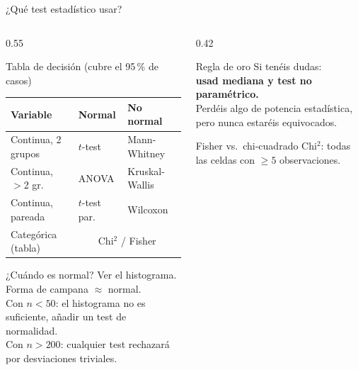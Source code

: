 \documentclass[aspectratio=169,10pt]{beamer}
\begin{document}
\begin{frame}{¿Qué test estadístico usar?}
  \begin{columns}[T]
    \begin{column}{0.55\textwidth}
      \begin{block}{Tabla de decisión (cubre el 95\,\% de casos)}
        \centering\small
        \renewcommand{\arraystretch}{1.4}
        \begin{tabular}{p{2.8cm}p{1.9cm}p{1.9cm}}
          \toprule
          \textbf{Variable} & \textbf{Normal} & \textbf{No normal} \\
          \midrule
          Continua, 2 grupos & $t$-test & Mann-Whitney \\
          Continua, $>$2 gr. & ANOVA & Kruskal-Wallis \\
          Continua, pareada  & $t$-test par. & Wilcoxon \\
          Categórica (tabla) & \multicolumn{2}{c}{Chi$^2$ / Fisher} \\
          \bottomrule
        \end{tabular}
      \end{block}
      \vspace{3mm}
      \begin{exampleblock}{¿Cuándo es normal?}
        \scriptsize Ver el histograma. Forma de campana $\approx$ normal.\\
        Con $n<50$: el histograma no es suficiente, añadir un test de normalidad.\\
        Con $n>200$: cualquier test rechazará por desviaciones triviales.
      \end{exampleblock}
    \end{column}
    \begin{column}{0.42\textwidth}
      \vspace{3mm}
      \begin{block}{Regla de oro}
        Si tenéis dudas:\\
        \textbf{usad mediana y test no paramétrico.}\\[2mm]
        \scriptsize Perdéis algo de potencia estadística,
        pero nunca estaréis equivocados.
      \end{block}
      \vspace{3mm}
      \begin{block}{Fisher vs.\ chi-cuadrado}
        \scriptsize Chi$^2$: todas las celdas con $\geq 5$ observaciones.\\

\end{block}
\end{column}
\end{columns}
\end{frame}
\end{document}
